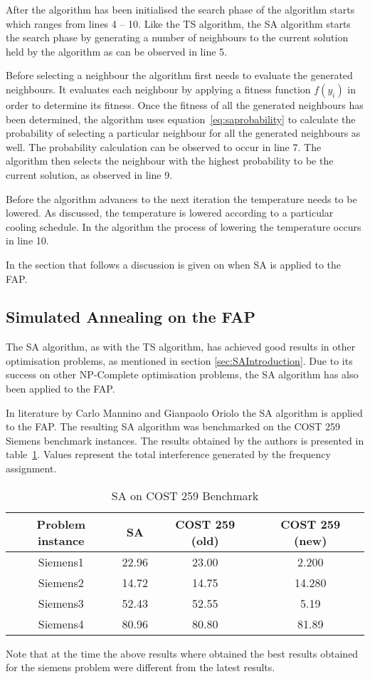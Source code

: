 After the algorithm has been initialised the search phase of the algorithm starts which ranges from lines 4 -- 10. Like the TS algorithm, the SA algorithm starts the search phase by generating a number of neighbours to the current solution held by the algorithm as can be observed in line 5.

Before selecting a neighbour the algorithm first needs to evaluate the generated neighbours. It evaluates each neighbour by applying a fitness function $f(y_i)$ in order to determine its fitness.
Once the fitness of all the generated neighbours has been determined, the algorithm uses equation~\ref{eq:saprobability} to calculate the probability of selecting a particular neighbour for all the generated neighbours as well. The probability calculation can be observed to occur in line 7. The algorithm then selects the neighbour with the highest probability to be the current solution, as observed in line 9. 

Before the algorithm advances to the next iteration the temperature needs to be lowered. As discussed, the temperature is lowered according to a particular cooling schedule. In the algorithm the process of lowering the temperature occurs in line 10.

In the section that follows a discussion is given on when SA is applied to the FAP.
\subsection{Simulated Annealing on the FAP}
The SA algorithm, as with the TS algorithm, has achieved good results in other optimisation problems, as mentioned in section \ref{sec:SAIntroduction}. Due to its success on other NP-Complete optimisation problems, the SA algorithm has also been applied to the FAP.

In literature by Carlo Mannino and Gianpaolo Oriolo\cite{SolvingSuperIntervalGraphs} the SA algorithm is applied to the FAP. The resulting SA algorithm was benchmarked on the COST 259 Siemens benchmark instances. The results obtained by the authors is presented in table~\ref{tab:SA}. Values represent the total interference generated by the frequency assignment. 
\begin{table}[H]
\centering
	\begin{tabular}{| c | c | c | c |}
	\hline
	Problem instance & SA & COST 259 (old) & COST 259 (new) \\ \hline
	Siemens1 & 22.96 & 23.00 & 2.200\\ \hline
	Siemens2 & 14.72 & 14.75 & 14.280\\ \hline
	Siemens3 & 52.43 & 52.55 & 5.19\\ \hline
	Siemens4 & 80.96 & 80.80 & 81.89\\ \hline
	\end{tabular}
\caption{SA on COST 259 Benchmark}
\label{tab:SA}
\end{table}
Note that at the time the above results where obtained the best results obtained for the siemens problem were different from the latest results.

